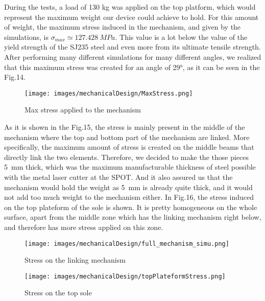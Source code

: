 \documentclass[lettersize,journal]{IEEEtran}
\begin{document}
During the tests, a load of 130 kg was applied on the top platform, which would represent the maximum weight our device could achieve to hold. For this amount of weight, the maximum stress induced in the mechanism, and given by the simulations, is $\sigma_{max} \simeq \SI{127.428}{MPa}$. This value is a lot below the value of the yield strength of the SJ235 steel and even more from its ultimate tensile strength. After performing many different simulations for many different angles, we realized that this maximum stress was created for an angle of 29°, as it can be seen in the Fig.14.


\begin{figure}[!h]
    \centering
    \texttt{[image: images/mechanicalDesign/MaxStress.png]}
    \caption{\centering Max stress applied to the mechanism}
    \label{fig:Mechanical_simulation}
\end{figure}


As it is shown in the Fig.15, the stress is mainly present in the middle of the mechanism where the top and bottom part of the mechanism are linked. More specifically, the maximum amount of stress is created on the middle beams that directly link the two elements. Therefore, we decided to make the those pieces \SI{5}{mm} thick, which was the maximum manufacturable thickness of steel possible with the metal laser cutter at the SPOT. And it also assured us that the mechanism would hold the weight as \SI{5}{mm} is already quite thick, and it would not add too much weight to the mechanism either.
In Fig.16, the stress induced on the top plateform of the sole is shown. It is pretty homogeneous on the whole surface, apart from the middle zone which has the linking mechanism right below, and therefore has more stress applied on this zone.
\newline

\begin{figure}[!h]
    \centering
    \texttt{[image: images/mechanicalDesign/full\_mechanism\_simu.png]}
    \caption{\centering Stress on the linking mechanism}
    \label{fig:Mechanical_simulation}
\end{figure}


\begin{figure}[!h]
    \centering
    \texttt{[image: images/mechanicalDesign/topPlateformStress.png]}
    \caption{\centering Stress on the top sole}
    \label{fig:Mechanical_simulation}
\end{figure}
\end{document}
